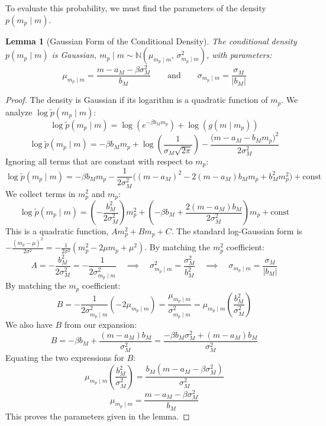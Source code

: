 \documentclass[linenum,doublespace,onecolumn]{SSA-SRL}
\theoremstyle{lemma}
\newtheorem{lemma}{Lemma}
\def\N{\mathbb{N}}
\begin{document}
To evaluate this probability, we must find the parameters of the density $p(m_p \mid m)$.

\begin{lemma}[Gaussian Form of the Conditional Density]
The conditional density $p(m_p \mid m)$ is Gaussian, $m_p\mid m \sim \N\!\left(\mu_{m_p\mid m},\,\sigma_{m_p\mid m}^2\right)$, with parameters:
\[
\mu_{m_p\mid m}=\frac{m-a_M-\beta\sigma_M^2}{b_M} \qquad \text{and} \qquad \sigma_{m_p\mid m}=\frac{\sigma_M}{|b_M|}
\]
\end{lemma}

\begin{proof}
The density is Gaussian if its logarithm is a quadratic function of $m_p$. We analyze $\log \tilde{p}(m_p\mid m)$:
\[
\log \tilde{p}(m_p\mid m) = \log(e^{-\beta b_M m_p}) + \log(g(m\mid m_p))
\]
\[
\log \tilde{p}(m_p\mid m) = -\beta b_M m_p + \log\left(\frac{1}{\sigma_M\sqrt{2\pi}}\right) -\frac{\big(m-a_M-b_M m_p\big)^2}{2\sigma_M^2}
\]
Ignoring all terms that are constant with respect to $m_p$:
\[
\log \tilde{p}(m_p\mid m) = -\beta b_M m_p -\frac{1}{2\sigma_M^2}\Big( (m-a_M)^2 - 2(m-a_M)b_M m_p + b_M^2 m_p^2 \Big) + \text{const}
\]
We collect terms in $m_p^2$ and $m_p$:
\[
\log \tilde{p}(m_p\mid m) = \left(-\frac{b_M^2}{2\sigma_M^2}\right)m_p^2 + \left(-\beta b_M + \frac{2(m-a_M)b_M}{2\sigma_M^2}\right)m_p + \text{const}
\]
This is a quadratic function, $Am_p^2 + Bm_p + C$. The standard log-Gaussian form is $-\frac{(m_p-\mu)^2}{2\sigma^2} = -\frac{1}{2\sigma^2}(m_p^2 - 2\mu m_p + \mu^2)$.
By matching the $m_p^2$ coefficient:
\[
A = -\frac{b_M^2}{2\sigma_M^2} = -\frac{1}{2\sigma_{m_p\mid m}^2} \quad \implies \quad \sigma_{m_p\mid m}^2 = \frac{\sigma_M^2}{b_M^2} \quad \implies \quad \sigma_{m_p\mid m} = \frac{\sigma_M}{|b_M|}
\]
By matching the $m_p$ coefficient:
\[
B = -\frac{1}{2\sigma_{m_p\mid m}^2}(-2\mu_{m_p\mid m}) = \frac{\mu_{m_p\mid m}}{\sigma_{m_p\mid m}^2} = \mu_{m_p\mid m} \left(\frac{b_M^2}{\sigma_M^2}\right)
\]
We also have $B$ from our expansion:
\[
B = -\beta b_M + \frac{(m-a_M)b_M}{\sigma_M^2} = \frac{-\beta b_M \sigma_M^2 + (m-a_M)b_M}{\sigma_M^2}
\]
Equating the two expressions for $B$:
\[
\mu_{m_p\mid m} \left(\frac{b_M^2}{\sigma_M^2}\right) = \frac{b_M(m-a_M-\beta \sigma_M^2)}{\sigma_M^2}
\]
\[
\mu_{m_p\mid m} = \frac{m-a_M-\beta\sigma_M^2}{b_M}
\]
This proves the parameters given in the lemma.
\end{proof}
\end{document}
